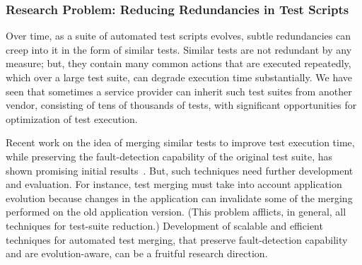 \subsubsection*{Research Problem: Reducing Redundancies in Test Scripts}

Over time, as a suite of automated test scripts evolves, subtle redundancies can
creep into it in the form of similar tests. Similar tests are not redundant by
any measure; but, they contain many common actions that are executed repeatedly,
which over a large test suite, can degrade execution time substantially.  We
have seen that sometimes a service provider can inherit such test suites from
another vendor, consisting of tens of thousands of tests, with significant
opportunities for optimization of test execution.

Recent work on the idea of merging similar tests to improve test execution time,
while preserving the fault-detection capability of the original test suite, has
shown promising initial results~\cite{Devaki:2013}. But, such techniques need
further development and evaluation. For instance, test merging must take into
account application evolution because changes in the application can invalidate
some of the merging performed on the old application version. (This problem
afflicts, in general, all techniques for test-suite reduction.)  Development of
scalable and efficient techniques for automated test merging, that preserve
fault-detection capability and are evolution-aware, can be a fruitful research
direction.

